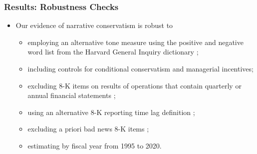 \documentclass{beamer}
\begin{document}
\begin{frame}
	\frametitle{Results: Robustness Checks}
\begin{itemize}
	\item Our evidence of narrative conservatism is robust to 
	\begin{itemize}
		\item employing an alternative tone measure using the positive and negative word list from the Harvard General Inquiry dictionary \citep{loughranTextualAnalysisAccounting2016};
		\item including controls for conditional conservatism and managerial incentives;
		\item excluding 8-K items on results of operations that contain quarterly or annual financial statements \citep{segalAreManagersStrategic2016};
		\item using an alternative 8-K reporting time lag definition \citep{carterRelevanceForm8K1999, niessnerStrategicDisclosureTiming2015, chapmanInformationOverloadDisclosure2019};
		\item excluding a priori bad news 8-K items \citep{segalAreManagersStrategic2016};
		\item estimating by fiscal year from 1995 to 2020.
	\end{itemize}
\end{itemize}
\end{frame}
\end{document}
